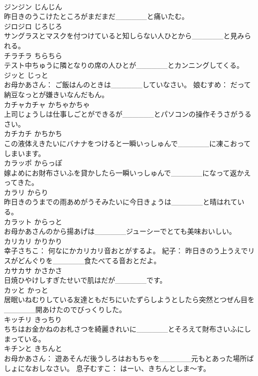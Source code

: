 \documentclass[8pt]{extreport}
\begin{document}
\begin{CJK}{UTF8}{min}
\\	ジンジン	じんじん	
\\	昨日きのうこけたところがまだまだ______と痛いたむ。	
\\	ジロジロ	じろじろ	
\\	サングラスとマスクを付つけていると知しらない人ひとから______と見みられる。	
\\	チラチラ	ちらちら	
\\	テスト中ちゅうに隣となりの席の人ひとが______とカンニングしてくる。	
\\	ジッと	じっと	
\\	お母かあさん： ご飯はんのときは______していなさい。 娘むすめ： だって納豆なっとが嫌きいなんだもん。	
\\	カチャカチャ	かちゃかちゃ	
\\	上司じょうしは仕事しごとができるが______とパソコンの操作そうさがうるさい。	
\\	カチカチ	かちかち	
\\	この液体えきたいにバナナをつけると一瞬いっしゅんで______に凍こおってしまいます。	
\\	カラッポ	からっぽ	
\\	嫁よめにお財布さいふを貸かしたら一瞬いっしゅんで______になって返かえってきた。	
\\	カラリ	からり	
\\	昨日きのうまでの雨あめがうそみたいに今日きょうは______と晴はれている。	
\\	カラット	からっと	
\\	お母かあさんのから揚あげは______ジューシーでとても美味おいしい。	
\\	カリカリ	かりかり	
\\	幸子さちこ： 何なにかカリカリ音おとがするよ。 紀子： 昨日きのう上うえでリスがどんぐりを______食たべてる音おとだよ。	
\\	カサカサ	かさかさ	
\\	日焼ひやけしすぎたせいで肌はだが______です。	
\\	カッと	かっと	
\\	居眠いねむりしている友達ともだちにいたずらしようとしたら突然とつぜん目を______開あけたのでびっくりした。	
\\	キッチリ	きっちり	
\\	ちちはお金かねのお札さつを綺麗きれいに______とそろえて財布さいふにしまっている。	
\\	キチンと	きちんと	
\\	お母かあさん： 遊あそんだ後うしろはおもちゃを______元もとあった場所ばしょになおしなさい。 息子むすこ： はーい、きちんとしま～す。	

\end{CJK}
\end{document}
